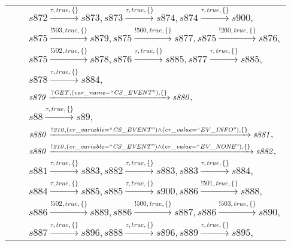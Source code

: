 \begin{tabular}{lcl}
& & $\mathit{s872}\xrightarrow{\mathit{\tau}, \mathit{true}, \{\}}\mathit{s873},\mathit{s873}\xrightarrow{\mathit{\tau}, \mathit{true}, \{\}}\mathit{s874},\mathit{s874}\xrightarrow{\mathit{\tau}, \mathit{true}, \{\}}\mathit{s900},$ \\
& & $\mathit{s875}\xrightarrow{\mathit{!503}, \mathit{true}, \{\}}\mathit{s879},\mathit{s875}\xrightarrow{\mathit{!560}, \mathit{true}, \{\}}\mathit{s877},\mathit{s875}\xrightarrow{\mathit{!260}, \mathit{true}, \{\}}\mathit{s876},$ \\
& & $\mathit{s875}\xrightarrow{\mathit{!502}, \mathit{true}, \{\}}\mathit{s878},\mathit{s876}\xrightarrow{\mathit{\tau}, \mathit{true}, \{\}}\mathit{s885},\mathit{s877}\xrightarrow{\mathit{\tau}, \mathit{true}, \{\}}\mathit{s885},$ \\
& & $\mathit{s878}\xrightarrow{\mathit{\tau}, \mathit{true}, \{\}}\mathit{s884},$ \\
& & $\mathit{s879}\xrightarrow{\mathit{?GET}, \mathit{(var\_name = ``CS\_EVENT")}, \{\}}\mathit{s880},$ \\
& & $\mathit{s88}\xrightarrow{\mathit{\tau}, \mathit{true}, \{\}}\mathit{s89},$ \\
& & $\mathit{s880}\xrightarrow{\mathit{!210}, \mathit{(cr\_variable = ``CS\_EVENT") \land (cr\_value = ``EV\_INFO")}, \{\}}\mathit{s881},$ \\
& & $\mathit{s880}\xrightarrow{\mathit{!210}, \mathit{(cr\_variable = ``CS\_EVENT") \land (cr\_value = ``EV\_NONE")}, \{\}}\mathit{s882},$ \\
& & $\mathit{s881}\xrightarrow{\mathit{\tau}, \mathit{true}, \{\}}\mathit{s883},\mathit{s882}\xrightarrow{\mathit{\tau}, \mathit{true}, \{\}}\mathit{s883},\mathit{s883}\xrightarrow{\mathit{\tau}, \mathit{true}, \{\}}\mathit{s884},$ \\
& & $\mathit{s884}\xrightarrow{\mathit{\tau}, \mathit{true}, \{\}}\mathit{s885},\mathit{s885}\xrightarrow{\mathit{\tau}, \mathit{true}, \{\}}\mathit{s900},\mathit{s886}\xrightarrow{\mathit{!501}, \mathit{true}, \{\}}\mathit{s888},$ \\
& & $\mathit{s886}\xrightarrow{\mathit{!502}, \mathit{true}, \{\}}\mathit{s889},\mathit{s886}\xrightarrow{\mathit{!500}, \mathit{true}, \{\}}\mathit{s887},\mathit{s886}\xrightarrow{\mathit{!503}, \mathit{true}, \{\}}\mathit{s890},$ \\
& & $\mathit{s887}\xrightarrow{\mathit{\tau}, \mathit{true}, \{\}}\mathit{s896},\mathit{s888}\xrightarrow{\mathit{\tau}, \mathit{true}, \{\}}\mathit{s896},\mathit{s889}\xrightarrow{\mathit{\tau}, \mathit{true}, \{\}}\mathit{s895},$ \\
\end{tabular}

